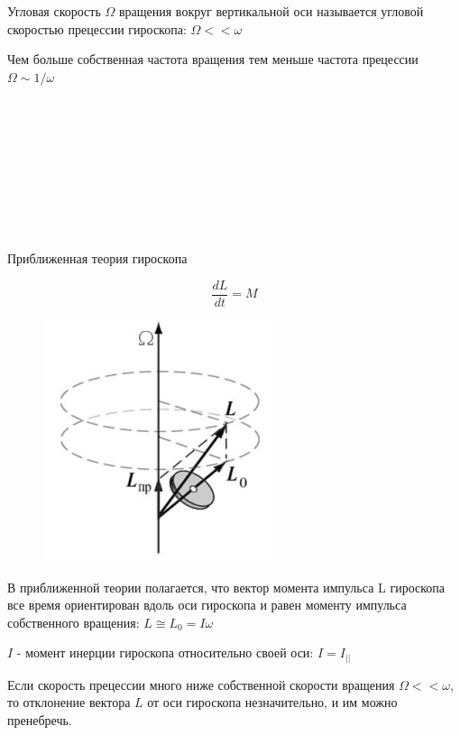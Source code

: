 Угловая скорость $\Omega$ вращения вокруг вертикальной оси называется угловой 
скоростью прецессии гироскопа:  $\Omega << \omega$

Чем больше собственная частота вращения тем меньше частота прецессии $\Omega \sim 1/\omega$

\ 

\ 

\ 

\ 

\ 

Приближенная теория гироскопа

$$\frac{dL}{dt} = M$$


\begin{figure}
    \centering
    \includegraphics[width=\linewidth]{imgs/q12i3.png}
\end{figure}

В приближенной теории полагается, что вектор момента импульса L гироскопа все 
время ориентирован вдоль оси гироскопа и равен моменту импульса собственного 
вращения: $L \cong L_0 = I\omega$

$I$ - момент инерции гироскопа относительно своей оси: $I = I_{||}$

Если скорость прецессии много ниже 
собственной скорости вращения $\Omega << \omega$, то отклонение вектора $L$ от оси гироскопа 
незначительно, и им можно пренебречь. 


